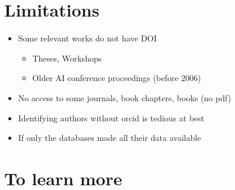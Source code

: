 \documentclass[final,hyperref={pdfpagelabels=false}]{beamer}
\begin{document}
\begin{frame}{}
\begin{multicols}{2}
\section{Limitations}
\begin{itemize}
\item Some relevant works do not have DOI 
\begin{itemize}
\item Theses, Workshops
\item Older AI conference proceedings (before 2006)
\end{itemize}
\item No access to some journals, book chapters, books (no pdf) 
\item Identifying authors without orcid is tedious at best
\item If only the databases made all their data available
\end{itemize} 
\section{To learn more}
\begin{center}
\end{center}

\end{multicols}
\end{frame}
\end{document}
